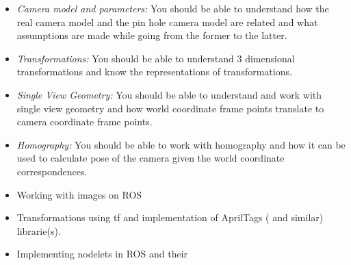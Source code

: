 \documentclass[letta4 paper]{article}
\numberwithin{equation}{section}
\newcommand{\0}{\mathbf{0}}
\begin{document}
	\begin{itemize}
        \item \textit{Camera model and parameters:} You should be able to understand how the real camera model and the pin hole camera model are related and what assumptions are made while going from the former to the latter.
		\item \textit{Transformations:} You should be able to understand 3 dimensional transformations and know the representations of transformations. 
		\item \textit{Single View Geometry:} You should be able to understand and work with single view geometry and how world coordinate frame points translate to camera coordinate frame points. 
		\item \textit{Homography:} You should be able to work with homography and how it can be used to calculate pose of the camera given the world coordinate correspondences.
        \item Working with images on ROS
		\item Transformations using tf and implementation of AprilTags ( and similar) librarie(s). \item Implementing nodelets in ROS and their 
	\end{itemize}
	
\end{document}
